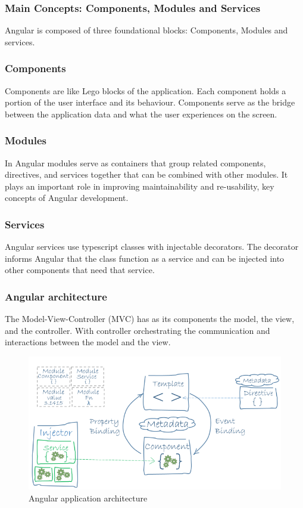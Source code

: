 \subsubsection{Main Concepts: Components, Modules and Services}
Angular is composed of three foundational blocks: Components, Modules and services.

\subsubsection{Components} Components are like Lego blocks of the application. Each component holds a portion of the user interface and its behaviour. Components serve as the bridge between the application data and what the user experiences on the screen.\cite{angular-components}

\subsubsection{Modules} In Angular modules serve as containers that group related components, directives, and services together that can be combined with other modules. It plays an important role in improving maintainability and re-usability, key concepts of Angular development.\cite{angular-modules}

\subsubsection{Services} Angular services use typescript classes with injectable decorators. The decorator informs Angular that the class function as a service
and can be injected into other components that need that service.\cite{angular-services}
\subsubsection{Angular architecture} 
The Model-View-Controller (MVC) has as its components the model, the view, and the controller. With controller orchestrating the communication and
interactions between the model and the view.

\begin{figure}[ht]
    \centering
    \includegraphics[width=0.85\linewidth]{images/angular-arch.png}
    \caption{Angular application architecture}
    \label{fig:angular-arch}
\end{figure}

